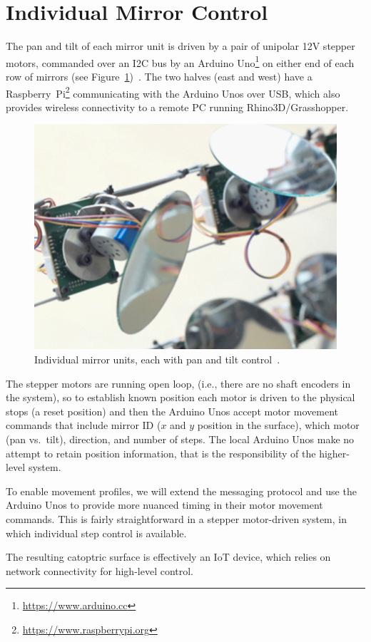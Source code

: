 \section{Individual Mirror Control}
\label{sec:mirror}

The pan and tilt of each mirror unit is driven by a pair of
unipolar 12V stepper motors, commanded over an I2C bus by an
Arduino Uno\footnote{\url{https://www.arduino.cc}} on either end of
each row of mirrors (see Figure~\ref{fig:mirror})~\cite{acadia18}.
The two halves (east and west) have a
Raspberry~Pi\footnote{\url{https://www.raspberrypi.org}}
communicating with the Arduino Unos over USB, which also provides
wireless connectivity to a remote PC running Rhino3D/Grasshopper.

\begin{figure}[ht]
\centering
\includegraphics[width=0.98\columnwidth]{mirror}
\caption{Individual mirror units,
each with pan and tilt control~\protect\cite{acadia18}.}
\label{fig:mirror}
\end{figure}

The stepper motors are running open loop,
(i.e., there are no shaft encoders in the system),
so to establish known position each
motor is driven to the physical stops (a reset position) and then
the Arduino Unos accept motor movement commands that include
mirror ID ($x$ and $y$ position in the surface), which motor (pan vs.\ tilt),
direction, and number of steps.
The local Arduino Unos make no
attempt to retain position information, that is the responsibility
of the higher-level system.

To enable movement profiles, we will extend the messaging protocol
and use the Arduino Unos to provide more nuanced timing in their
motor movement commands. This is fairly straightforward in a stepper
motor-driven system, in which individual step control is available.

The resulting catoptric surface is effectively an IoT device, which
relies on network connectivity for high-level control.
